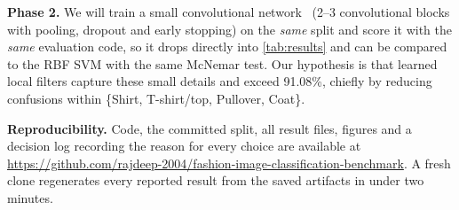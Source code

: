 \documentclass[conference]{IEEEtran}
\begin{document}
\textbf{Phase 2.} We will train a small convolutional network~\cite{lecun1998gradient} (2--3 convolutional blocks with
pooling, dropout and early stopping) on the \emph{same} split and score it with the \emph{same} evaluation code, so it
drops directly into \cref{tab:results} and can be compared to the RBF SVM with the same McNemar test. Our hypothesis is
that learned local filters capture these small details and exceed 91.08\%, chiefly by reducing confusions within
\{Shirt, T-shirt/top, Pullover, Coat\}.

\textbf{Reproducibility.} Code, the committed split, all result files, figures and a decision log recording the reason for
every choice are available at \url{https://github.com/rajdeep-2004/fashion-image-classification-benchmark}. A fresh clone
regenerates every reported result from the saved artifacts in under two minutes.
\end{document}
